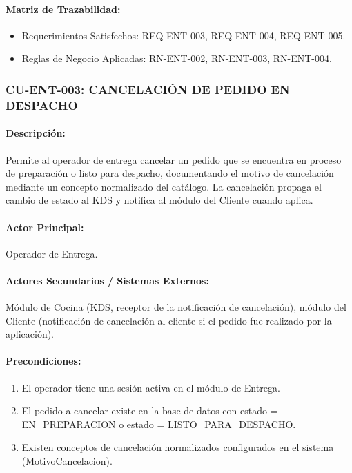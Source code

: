 \paragraph{Matriz de Trazabilidad:}
\begin{itemize}
    \item Requerimientos Satisfechos: REQ-ENT-003, REQ-ENT-004, REQ-ENT-005.
    \item Reglas de Negocio Aplicadas: RN-ENT-002, RN-ENT-003, RN-ENT-004.
\end{itemize}

\subsubsection{CU-ENT-003: CANCELACIÓN DE PEDIDO EN DESPACHO}
\paragraph{Descripción:} Permite al operador de entrega cancelar un pedido que se encuentra en proceso de preparación o listo para despacho, documentando el motivo de cancelación mediante un concepto normalizado del catálogo. La cancelación propaga el cambio de estado al KDS y notifica al módulo del Cliente cuando aplica.

\paragraph{Actor Principal:} Operador de Entrega.

\paragraph{Actores Secundarios / Sistemas Externos:} Módulo de Cocina (KDS, receptor de la notificación de cancelación), módulo del Cliente (notificación de cancelación al cliente si el pedido fue realizado por la aplicación).

\paragraph{Precondiciones:}
\begin{enumerate}
    \item[I.] El operador tiene una sesión activa en el módulo de Entrega.
    \item[II.] El pedido a cancelar existe en la base de datos con estado = EN\_PREPARACION o estado = LISTO\_PARA\_DESPACHO.
    \item[III.] Existen conceptos de cancelación normalizados configurados en el sistema (MotivoCancelacion).
\end{enumerate}

